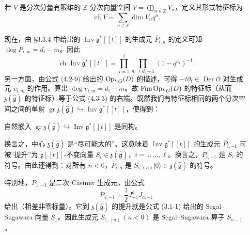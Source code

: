 若 $V$ 是分次分量有限维的 $\mathbb{Z}$-分次向量空间 $V=\bigoplus_{n\in\mathbb{Z}}V_n$，定义其形式特征标为
\[
    \operatorname{ch}V=\sum_{n\in\mathbb{Z}}\dim V_nq^n.
\]

现在，由 §3.3.4 中给出的 $\operatorname{Inv}\mathfrak{g}^*[[t]]$ 的生成元 $\overline{P}_{i,n}$ 的定义可知 $\deg\overline{P}_{i,m}=d_i-m$。因此
\begin{equation}
    \operatorname{ch}\operatorname{Inv}\mathfrak{g}^*[[t]]=\prod_{i=1}^{\ell}\prod_{n_i\ge d_i+1}(1-q^{n_i})^{-1}.
    \tag{4.3-3}
\end{equation}
另一方面，由公式 (4.2-9) 给出的 $\operatorname{Op}_{{}^LG}(D)$ 的描述，可得 $-t\partial_t\in\operatorname{Der}\mathcal{O}$ 对生成元 $v_{i,m}$ 的作用。算出 $\deg v_{i,m}=d_i-m$。故 $\operatorname{Fun}\operatorname{Op}_{{}^LG}(D)$ 的特征标（从而 $\mathfrak{z}(\hat{\mathfrak{g}})$ 的特征标）等于公式 (4.3-3) 的右端。既然我们有特征标相同的两个分次空间之间的单射 $\operatorname{gr}\mathfrak{z}(\hat{\mathfrak{g}})\hookrightarrow\operatorname{Inv}\mathfrak{g}^*[[t]]$，便得到：

\begin{proposition}
    自然嵌入 $\operatorname{gr}\mathfrak{z}(\hat{\mathfrak{g}})\hookrightarrow\operatorname{Inv}\mathfrak{g}^*[[t]]$ 是同构。
\end{proposition}

换言之，中心 $\mathfrak{z}(\hat{\mathfrak{g}})$ 是“尽可能大的”。这意味着 $\operatorname{Inv}\mathfrak{g}^*[[t]]$ 的生成元 $\overline{P}_{i,-1}$ 可被“提升”为 $\mathfrak{g}[[t]]$-不变向量 $S_i\in\mathfrak{z}(\hat{\mathfrak{g}})$，$i=1,\dots,\ell$。换言之，$\overline{P}_{i,-1}$ 是 $S_i$ 的符号。由此还得到：对所有 $n<0$，$\overline{P}_{i,n}$ 是 $S_{i,(n)}|0\rangle\in\mathfrak{z}(\hat{\mathfrak{g}})$ 的符号。


特别地，$\overline{P}_{1,-1}$ 是二次 Casimir 生成元，由公式
\[
    \overline{P}_{1,-1}=\frac{1}{2}J^a_{-1}J_{a,-1}
\]
给出（相差非零标量）。它到 $\mathfrak{z}(\hat{\mathfrak{g}})$ 的提升就是公式 (3.1-1) 给出的 Segal--Sugawara 向量 $S_1$。因此生成元 $S_{1,(n)}\,(n<0)$ 是 Segal--Sugawara 算子 $S_{n-1}$。

